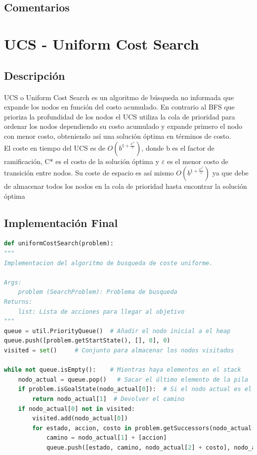 \documentclass{report}
\begin{document}
        \subsection*{Comentarios}
      \clearpage\section{UCS - Uniform Cost Search}
        \subsection*{Descripción}
          \paragraph*{}{
            UCS o Uniform Cost Search es un algoritmo de búsqueda no informada que expande los nodos en función del costo acumulado. En contrario al BFS que prioriza la profundidad de los nodos el UCS utiliza la cola de prioridad para ordenar los nodos dependiendo su costo acumulado y expande primero el nodo con menor costo, obteniendo así una solución óptima en términos de costo.\\  
            El coste en tiempo del UCS es de \( O(b^{1 +\frac{ C^*}{\varepsilon}}) \), donde b es el factor de ramificación, C* es el costo de la solución óptima y \( \varepsilon \)  es el menor costo de transición entre nodos. Su coste de espacio es así mismo \( O(b^{1 +\frac{ C^*}{\varepsilon}}) \) ya que debe de almacenar todos los nodos en la cola de prioridad hasta encontrar la solución óptima \\
          }
        \subsection*{Implementación Final}
            \begin{lstlisting}[language=Python, caption=Implementación final del UCS]
def uniformCostSearch(problem):
"""
Implementacion del algoritmo de busqueda de coste uniforme.

Args:
    problem (SearchProblem): Problema de busqueda
Returns:
    list: Lista de acciones para llegar al objetivo
"""
queue = util.PriorityQueue()  # Añadir el nodo inicial a el heap
queue.push([problem.getStartState(), [], 0], 0)
visited = set()     # Conjunto para almacenar los nodos visitados

while not queue.isEmpty():    # Mientras haya elementos en el stack
    nodo_actual = queue.pop()   # Sacar el último elemento de la pila
    if problem.isGoalState(nodo_actual[0]):  # Si el nodo actual es el objetivo
        return nodo_actual[1]  # Devolver el camino
    if nodo_actual[0] not in visited:
        visited.add(nodo_actual[0])
        for estado, accion, costo in problem.getSuccessors(nodo_actual[0]): # Añadir los hijos del nodo actual a la pila
            camino = nodo_actual[1] + [accion]
            queue.push([estado, camino, nodo_actual[2] + costo], nodo_actual[2] + costo)
            \end{lstlisting}
\end{document}
